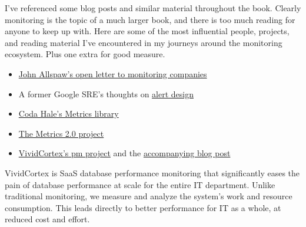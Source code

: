 \documentclass{vivid_layout}
\begin{document}
I've referenced some blog posts and similar material throughout the book.
Clearly monitoring is the topic of a much larger book, and there is too much
reading for anyone to keep up with. Here are some of the most influential
people, projects, and reading material I've encountered in my journeys around
the monitoring ecosystem. Plus one extra for good measure.

\begin{itemize}
\item \href{http://www.kitchensoap.com/2015/05/01/openlettertomonitoringproducts/}{John Allspaw's open letter to monitoring companies}
\item A former Google SRE's thoughts on
\href{https://docs.google.com/document/d/199PqyG3UsyXlwieHaqbGiWVa8eMWi8zzAn0YfcApr8Q/edit}{alert
design}
\item \href{http://metrics.dropwizard.io/}{Coda Hale's Metrics library}
\item \href{http://metrics20.org/}{The Metrics 2.0 project}
\item \href{https://github.com/VividCortex/pm}{VividCortex's pm project} and the
\href{https://www.vividcortex.com/blog/2014/11/06/inside-distributed-architecture/}{accompanying
blog post}
\end{itemize}

\newpage

\begin{about}	%
VividCortex is SaaS database performance monitoring that significantly eases the pain of database performance at scale for the entire IT department. Unlike traditional monitoring, we measure
and analyze the system's work and resource consumption. This leads directly to better performance for IT as a whole, at reduced cost and effort.
\end{about}
\makeresources	%
\end{document}
